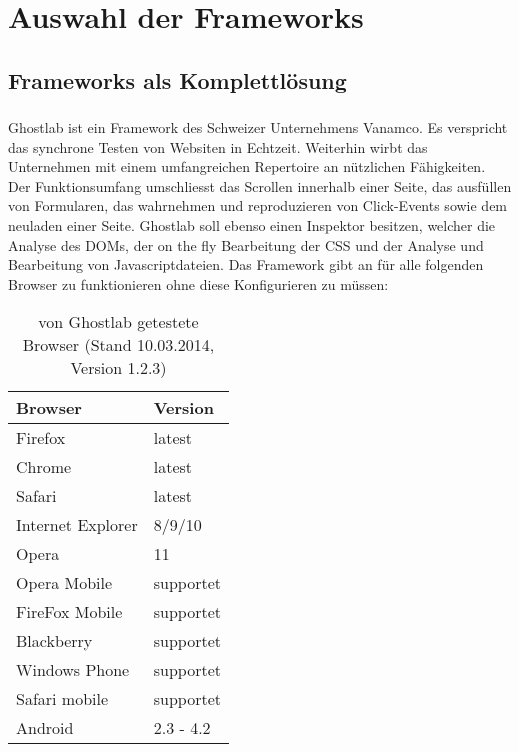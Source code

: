 \chapter{Auswahl der Frameworks}
\section{Frameworks als Komplettlösung}
	\subsection{}
	Ghostlab ist ein Framework des Schweizer Unternehmens Vanamco. Es verspricht das synchrone Testen von Websiten in 		Echtzeit. Weiterhin wirbt das Unternehmen mit einem umfangreichen Repertoire an nützlichen Fähigkeiten. Der 				Funktionsumfang umschliesst das Scrollen innerhalb einer Seite, das ausfüllen von  Formularen, das wahrnehmen und 			reproduzieren von Click-Events sowie dem neuladen einer Seite. Ghostlab soll ebenso einen Inspektor besitzen, welcher die 		Analyse des DOMs, der on the fly Bearbeitung der CSS und der Analyse und Bearbeitung von Javascriptdateien. Das 			Framework gibt an für alle folgenden Browser zu funktionieren ohne diese Konfigurieren zu müssen:

	\begin{table}[H]
 		\centering
			\begin{tabular}{| p{5cm} | p{5cm} |}
			
			\hline
				Browser 	& 	Version\\
			\hline
			\hline
				Firefox	&	latest\\
				Chrome	&	latest\\
				Safari	&	latest\\
				Internet Explorer	&	8/9/10\\
				Opera	&	11\\
				Opera Mobile	&	supportet\\
				FireFox Mobile	&	supportet\\
				Blackberry	&	supportet\\
				Windows Phone	&	supportet\\
				Safari mobile	&	supportet\\	
				Android	&	2.3 - 4.2\\
				\hline
				\end{tabular}
			\caption{von Ghostlab getestete Browser (Stand 10.03.2014, Version 1.2.3)}
	\end{table}

